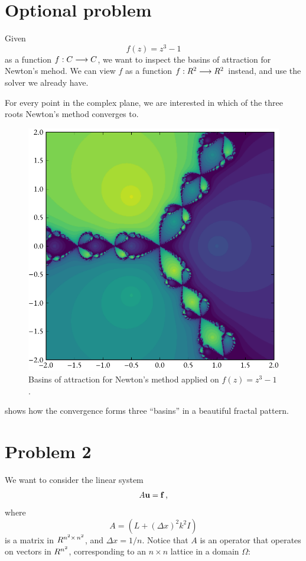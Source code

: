 \documentclass[12pt]{article}
\begin{document}
\begin{multicols}{2}
    \section*{Optional problem}
    Given
    \[
        f(z) = z^3 - 1
    \]
    as a function $f: \C \longrightarrow \C$, we want to inspect the basins
    of attraction for Newton's mehod.
    We can view $f$ as a function $f: \R^2 \longrightarrow \R^2$ instead,
    and use the solver we already have.

    For every point in the complex plane, we are interested in which
    of the three roots Newton's method converges to.
    \begin{figure}[H]
        \centering
        \includegraphics[width=0.75\columnwidth]{basins_rev}
        \caption{
            Basins of attraction for Newton's method applied on
            $f(z) = z^3 - 1$.
        }
        \label{fig:basins}
    \end{figure}\noindent
     shows how the convergence forms three ``basins'' in
    a beautiful fractal pattern.


    \section*{Problem 2}
    We want to consider the linear system
    \[
        A \vec u = \vec f \,\text,
    \]
    where
    \[
        A = \left(
            L + (\Delta x)^2 k^2 I
        \right)
    \]
    is a matrix in $\R^{{n^2} \times\, {n^2}}$,
    and $\Delta x = 1/n$. Notice that $A$ is an operator
    that operates on vectors in $\R^{n^2}$, corresponding to
    an $n \times n$ lattice in a domain $\Omega$:


\end{multicols}
\end{document}
